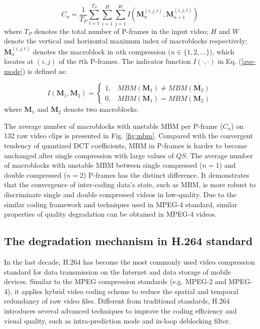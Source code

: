 \documentclass[journal,sort]{IEEEtran}
\begin{document}
\begin{equation}
C_n = \frac{1}{T_P}\sum_{t=1}^{T_P}\sum_{i=1}^{H}\sum_{j=1}^{W}I(\mathbf{M}_n^{(i,j,t)},\mathbf{M}_{n+1}^{(i,j,t)}) \label{ave-mode}
\end{equation}
where $T_P$ denotes the total number of P-frames in the input video; $H$ and $W$ denote the vertical and horizontal maximum index of macroblocks respectively; $\mathbf{M}_n^{(i,j,t)}$ denotes the macroblock in $n$th compression ($n\in\{1,2,...\}$), which locates at $(i,j)$ of the $t$th P-frames. The indicator function $I(\cdot,\cdot)$ in Eq. (\ref{ave-mode}) is defined as:

\begin{equation}
I(\mathbf{M}_1,\mathbf{M}_2) =
\begin{cases}
1, & MBM(\mathbf{M}_1) \ne MBM(\mathbf{M}_2) \\
0, & MBM(\mathbf{M}_1) = MBM(\mathbf{M}_2)
\end{cases}
\label{indicator}
\end{equation}
where $\mathbf{M}_1$ and $\mathbf{M}_2$ denote two macroblocks.

The average number of macroblocks with unstable MBM per P-frame ($C_n$) on 132 raw video clips is presented in Fig. \ref{fig:mbm}. Compared with the convergent tendency of quantized DCT coefficients, MBM in P-frames is harder to become unchanged after single compression with large values of $QS$. The average number of macroblocks with unstable MBM between single compressed ($n=1$) and double compressed ($n=2$) P-frames has the distinct difference. It demonstrates that the convergence of inter-coding data's state, such as MBM, is more robust to discriminate single and double compressed videos in low-quality. Due to the similar coding framework and techniques used in MPEG-4 standard, similar properties of quality degradation can be obtained in MPEG-4 videos.




\subsection{The degradation mechanism in H.264 standard\label{degrad_h264}}
In the last decade, H.264 has become the most commonly used video compression standard for data transmission on the Internet and data storage of mobile devices. Similar to the MPEG compression standards (e.g. MPEG-2 and MPEG-4), it applies hybrid video coding scheme to reduce the spatial and temporal redundancy of raw video files. Different from traditional standards, H.264 introduces several advanced techniques to improve the coding efficiency and visual quality, such as intra-prediction mode and in-loop deblocking filter. 
\end{document}
